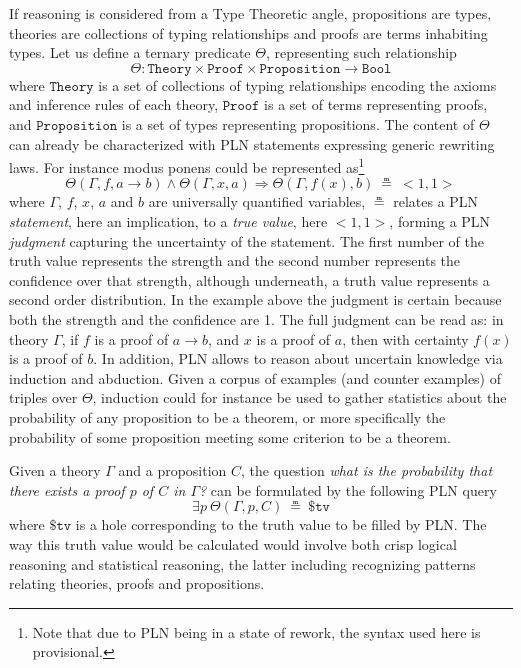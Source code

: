 \documentclass{easychair}
\newcommand{\U}{\Theta}
\newcommand{\Theory}{\texttt{Theory}}
\newcommand{\Proof}{\texttt{Proof}}
\newcommand{\Proposition}{\texttt{Proposition}}
\newcommand{\Bool}{\texttt{Bool}}
\newcommand{\arrow}{\to}
\newcommand{\limp}{\Rightarrow}
\newcommand{\True}{\texttt{True}}
\newcommand{\STV}[2]{<\!#1, #2\!>}
\begin{document}
If reasoning is considered from a Type Theoretic angle, propositions
are types, theories are collections of typing relationships and proofs
are terms inhabiting types.  Let us define a ternary predicate $\U$,
representing such relationship
$$\U : \Theory \times \Proof \times \Proposition \arrow \Bool$$ where
$\Theory$ is a set of collections of typing relationships encoding the
axioms and inference rules of each theory, $\Proof$ is a set of terms
representing proofs, and $\Proposition$ is a set of types representing
propositions.  The content of $\U$ can already be characterized with
PLN statements expressing generic rewriting laws.  For instance modus
ponens could be represented as\footnote{Note that due to PLN being in
a state of rework, the syntax used here is provisional.}
$$\U(\Gamma, f, a \to b) \land \U(\Gamma, x, a) \limp \U(\Gamma, f(x),
b)\ \measeq\ \STV{1}{1}$$ where $\Gamma$, $f$, $x$, $a$ and $b$ are
universally quantified variables,  %
$\measeq$ relates a PLN \emph{statement}, here an implication, to a
\emph{true value}, here $\STV{1}{1}$, forming a PLN \emph{judgment}
capturing the uncertainty of the statement.  The first number of the
truth value represents the strength and the second number represents
the confidence over that strength, although underneath, a truth value
represents a second order distribution.  In the example above the
judgment is certain because both the strength and the confidence are
1.  The full judgment can be read as: in theory $\Gamma$, if $f$ is a
proof of $a \arrow b$, and $x$ is a proof of $a$, then with certainty
$f(x)$ is a proof of $b$.  In addition, PLN allows to reason about
uncertain knowledge via induction and abduction.  Given a corpus of
examples (and counter examples) of triples over $\Theta$, induction
could for instance be used to gather statistics about the probability
of any proposition to be a theorem, or more specifically the
probability of some proposition meeting some criterion to be a
theorem.

Given a theory $\Gamma$ and a proposition $C$, the question \emph{what
is the probability that there exists a proof $p$ of $C$ in $\Gamma$?}
can be formulated by the following PLN query
$$\exists p\ \U(\Gamma, p, C)\ \measeq\ \$\texttt{tv}$$ where
$\$\texttt{tv}$ is a hole corresponding to the truth value to be
filled by PLN.  The way this truth value would be calculated would
involve both crisp logical reasoning and statistical reasoning, the
latter including recognizing patterns relating theories, proofs and
propositions.
\end{document}
